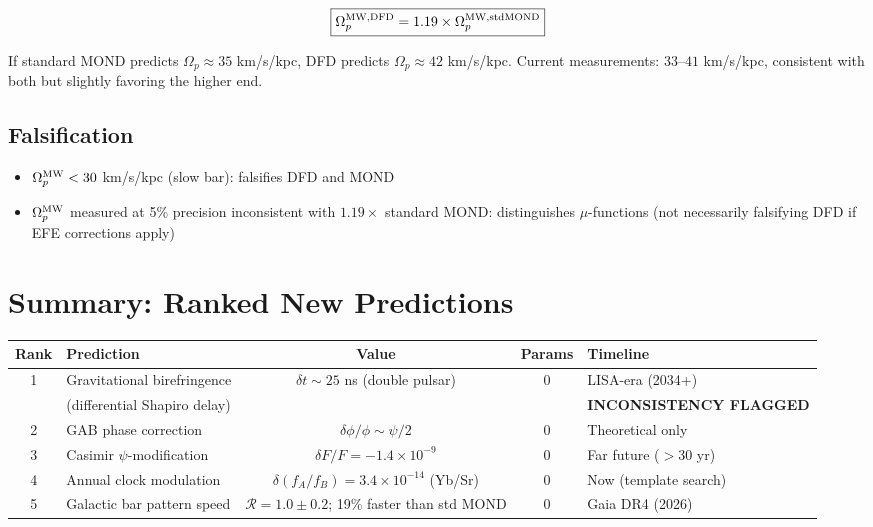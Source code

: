 \documentclass[11pt]{article}
\begin{document}
\begin{equation}
\boxed{\Omega_p^{\rm MW,DFD} = 1.19 \times \Omega_p^{\rm MW,stdMOND}}
\end{equation}

If standard MOND predicts $\Omega_p \approx 35$ km/s/kpc, DFD predicts
$\Omega_p \approx 42$ km/s/kpc. Current measurements: $33$--$41$ km/s/kpc,
consistent with both but slightly favoring the higher end.

\subsection{Falsification}

\begin{itemize}
\item $\Omega_p^{\rm MW} < 30$ km/s/kpc (slow bar): falsifies DFD and MOND
\item $\Omega_p^{\rm MW}$ measured at 5\% precision inconsistent with $1.19\times$
standard MOND: distinguishes $\mu$-functions (not necessarily falsifying DFD if
EFE corrections apply)
\end{itemize}

\section{Summary: Ranked New Predictions}
\label{sec:summary}

\begin{center}
\small
\begin{tabular}{clccl}
\toprule
\textbf{Rank} & \textbf{Prediction} & \textbf{Value} & \textbf{Params} & \textbf{Timeline} \\
\midrule
1 & Gravitational birefringence & $\delta t \sim 25$ ns (double pulsar) & 0 & LISA-era (2034+) \\
  & (differential Shapiro delay) & & & \textbf{INCONSISTENCY FLAGGED} \\
2 & GAB phase correction & $\delta\phi/\phi \sim \psi/2$ & 0 & Theoretical only \\
3 & Casimir $\psi$-modification & $\delta F/F = -1.4 \times 10^{-9}$ & 0 & Far future ($>$30 yr) \\
4 & Annual clock modulation & $\delta(f_A/f_B) = 3.4 \times 10^{-14}$ (Yb/Sr) & 0 & Now (template search) \\
5 & Galactic bar pattern speed & $\mathcal{R} = 1.0 \pm 0.2$; 19\% faster than std MOND & 0 & Gaia DR4 (2026) \\
\bottomrule
\end{tabular}
\end{center}
\end{document}
